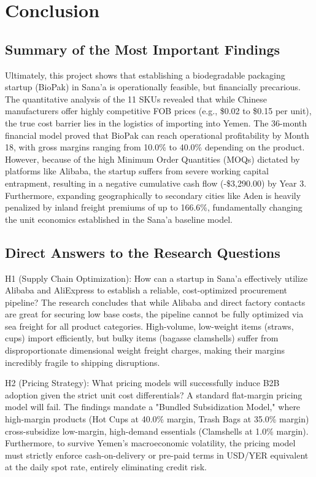 \documentclass[12pt,a4paper]{article}
\begin{document}
\section{Conclusion}

\subsection{Summary of the Most Important Findings}

Ultimately, this project shows that establishing a biodegradable packaging startup (BioPak) in Sana'a is operationally feasible, but financially precarious. The quantitative analysis of the 11 SKUs revealed that while Chinese manufacturers offer highly competitive FOB prices (e.g., \$0.02 to \$0.15 per unit), the true cost barrier lies in the logistics of importing into Yemen. The 36-month financial model proved that BioPak can reach operational profitability by Month 18, with gross margins ranging from 10.0\% to 40.0\% depending on the product. However, because of the high Minimum Order Quantities (MOQs) dictated by platforms like Alibaba, the startup suffers from severe working capital entrapment, resulting in a negative cumulative cash flow (-\$3,290.00) by Year 3. Furthermore, expanding geographically to secondary cities like Aden is heavily penalized by inland freight premiums of up to 166.6\%, fundamentally changing the unit economics established in the Sana'a baseline model.

\subsection{Direct Answers to the Research Questions}

H1 (Supply Chain Optimization): How can a startup in Sana'a effectively utilize Alibaba and AliExpress to establish a reliable, cost-optimized procurement pipeline? The research concludes that while Alibaba and direct factory contacts are great for securing low base costs, the pipeline cannot be fully optimized via sea freight for all product categories. High-volume, low-weight items (straws, cups) import efficiently, but bulky items (bagasse clamshells) suffer from disproportionate dimensional weight freight charges, making their margins incredibly fragile to shipping disruptions.

H2 (Pricing Strategy): What pricing models will successfully induce B2B adoption given the strict unit cost differentials? A standard flat-margin pricing model will fail. The findings mandate a "Bundled Subsidization Model," where high-margin products (Hot Cups at 40.0\% margin, Trash Bags at 35.0\% margin) cross-subsidize low-margin, high-demand essentials (Clamshells at 1.0\% margin). Furthermore, to survive Yemen's macroeconomic volatility, the pricing model must strictly enforce cash-on-delivery or pre-paid terms in USD/YER equivalent at the daily spot rate, entirely eliminating credit risk.
\end{document}
